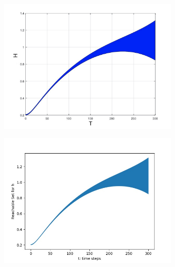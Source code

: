 \documentclass[EPiC]{easychair}
\begin{document}
\begin{figure}[h]
    \hspace{-12ex}
    \begin{subfigure}{0.6\textwidth}
    \centering
    \includegraphics[width=1.2\textwidth]{SapoFigures/Quad/SapoQuad_H.jpg}
    \end{subfigure}
    \hspace{5ex}
    \begin{subfigure}{0.6\textwidth}
    \centering
    \includegraphics[width=1.13\textwidth]{SapoFigures/Quad/KaaQuad_H.jpg}
    \end{subfigure}
    

\end{figure}
\end{document}
